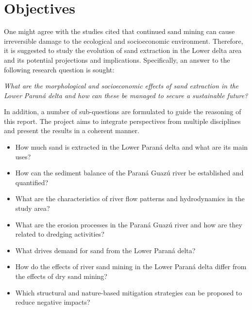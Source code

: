 \section{Objectives}


One might agree with the studies cited that continued sand mining can cause irreversible damage to the ecological and socioeconomic environment. Therefore, it is suggested to study the evolution of sand extraction in the Lower delta area and its potential projections and implications. Specifically, an answer to the following research question is sought:

\textit{What are the morphological and socioeconomic effects of sand extraction in the Lower Paraná delta and how can these be managed to secure a sustainable future?}

In addition, a number of sub-questions are formulated to guide the reasoning of this report. The project aims to integrate perspectives from multiple disciplines and present the results in a coherent manner.

\begin{itemize} 
    \item How much sand is extracted in the Lower Paraná delta and what are its main uses?
    \item How can the sediment balance of the Paraná Guazú river be established and quantified?
    \item What are the characteristics of river flow patterns and hydrodynamics in the study area?
    \item What are the erosion processes in the Paraná Guazú river and how are they related to dredging activities?
    \item What drives demand for sand from the Lower Paraná delta?
    \item How do the effects of river sand mining in the Lower Paraná delta differ from the effects of dry sand mining?
    \item Which structural and nature-based mitigation strategies can be proposed to reduce negative impacts?
\end{itemize}


